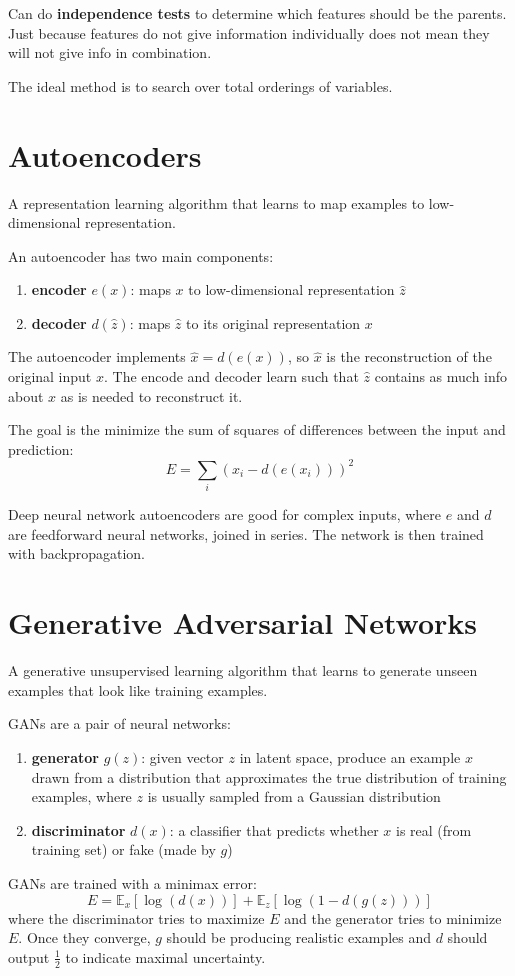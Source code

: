\documentclass[11pt]{article}
\begin{document}
Can do \textbf{independence tests} to determine which features should be the parents.
Just because features do not give information individually does not mean they will not give info
in combination.

The ideal method is to search over total orderings of variables.
\section{Autoencoders}
\label{sec:orgd1cb31b}
A representation learning algorithm that learns to map examples to low-dimensional representation.

An autoencoder has two main components:
\begin{enumerate}
\item \textbf{encoder} \(e(x)\): maps \(x\) to low-dimensional representation \(\hat{z}\)
\item \textbf{decoder} \(d(\hat{z})\): maps \(\hat{z}\) to its original representation \(x\)
\end{enumerate}

The autoencoder implements \(\hat{x} = d(e(x))\), so \(\hat{x}\) is the reconstruction of the original
input \(x\).
The encode and decoder learn such that \(\hat{z}\) contains as much info about \(x\) as is needed
to reconstruct it.

The goal is the minimize the sum of squares of differences between the input and prediction:
$$ E = \sum_{i} (x_{i} - d(e(x_{i})))^{2} $$

Deep neural network autoencoders are good for complex inputs,
where \(e\) and \(d\) are feedforward neural networks, joined in series.
The network is then trained with backpropagation.
\section{Generative Adversarial Networks}
\label{sec:org37569b8}
A generative unsupervised learning algorithm that learns to generate unseen examples that
look like training examples.

GANs are a pair of neural networks:
\begin{enumerate}
\item \textbf{generator} \(g(z)\): given vector \(z\) in latent space, produce an example \(x\) drawn from a
distribution that approximates the true distribution of training examples, where \(z\)
is usually sampled from a Gaussian distribution
\item \textbf{discriminator} \(d(x)\): a classifier that predicts whether \(x\) is real (from training set)
or fake (made by \(g\))
\end{enumerate}

GANs are trained with a minimax error:
$$ E = \mathbb{E}_{x} [ \log( d(x) )] + \mathbb{E}_{z}[ \log(1 - d(g(z)))] $$
where the discriminator tries to maximize \(E\) and the generator tries to minimize \(E\).
Once they converge, \(g\) should be producing realistic examples and \(d\) should output
\(\frac{1}{2}\) to indicate maximal uncertainty.
\end{document}

